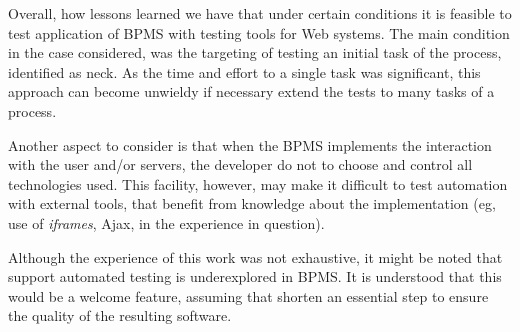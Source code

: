 \documentclass[runningheads,a4paper]{llncs}
\begin{document}
Overall, how lessons learned we have that under certain conditions it is feasible to test application of BPMS with testing tools for Web systems. The main condition in the case considered, was the targeting of testing an initial task of the process, identified as neck. As the time and effort to a single task was significant, this approach can become unwieldy if necessary extend the tests to many tasks of a process.

Another aspect to consider is that when the BPMS implements the interaction with the user and/or servers, the developer do not to choose and control all technologies used. This facility, however, may make it difficult to test automation with external tools, that benefit from knowledge about the implementation (eg, use of \emph{iframes}, Ajax, in the experience in question).


Although the experience of this work was not exhaustive, it might be noted that support automated testing is underexplored in BPMS. It is understood that this would be a welcome feature, assuming that shorten an essential step to ensure the quality of the resulting software.
\end{document}
